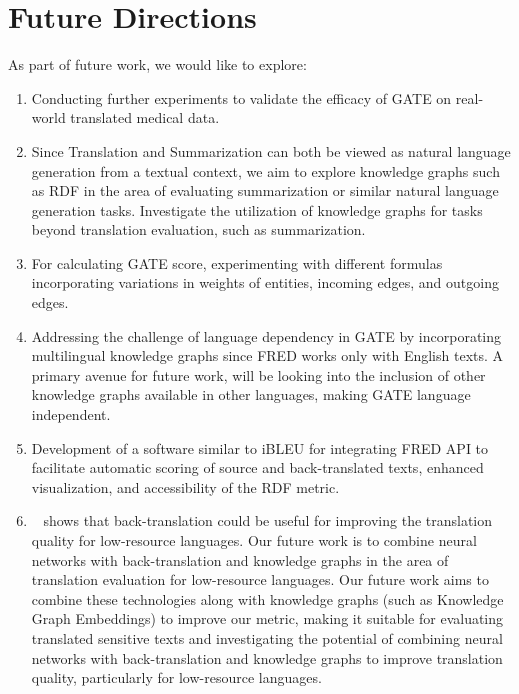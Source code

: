 \documentclass[runningheads]{llncs}
\begin{document}




\section{Future Directions}\label{future}


As part of future work, we would like to explore:

\begin{enumerate}
  \item Conducting further experiments to validate the efficacy of GATE on real-world translated medical data.
  \item Since Translation and Summarization can both be viewed as natural language generation from a textual context, we aim to explore knowledge graphs such as RDF in the area of evaluating summarization or similar natural language generation tasks. Investigate the utilization of knowledge graphs for tasks beyond translation evaluation, such as summarization.
  \item For calculating GATE score, experimenting with different formulas incorporating variations in weights of entities, incoming edges, and outgoing edges.
  \item Addressing the challenge of language dependency in GATE by incorporating multilingual knowledge graphs since FRED works only with English texts. A primary avenue for future work, will be looking into the inclusion of other knowledge graphs available in other languages, making GATE language independent.
 \item Development of a software similar to iBLEU for integrating FRED API to facilitate automatic scoring of source and back-translated texts, enhanced visualization, and accessibility of the RDF metric.
  \item~\cite{btfuture} shows that back-translation could be useful for improving the translation quality for low-resource languages. Our future work is to combine neural networks with back-translation and knowledge graphs in the area of translation evaluation for low-resource languages. Our future work aims to combine these technologies along with knowledge graphs (such as Knowledge Graph Embeddings) to improve our metric, making it suitable for evaluating translated sensitive texts and investigating the potential of combining neural networks with back-translation and knowledge graphs to improve translation quality, particularly for low-resource languages.
\end{enumerate}
\end{document}
